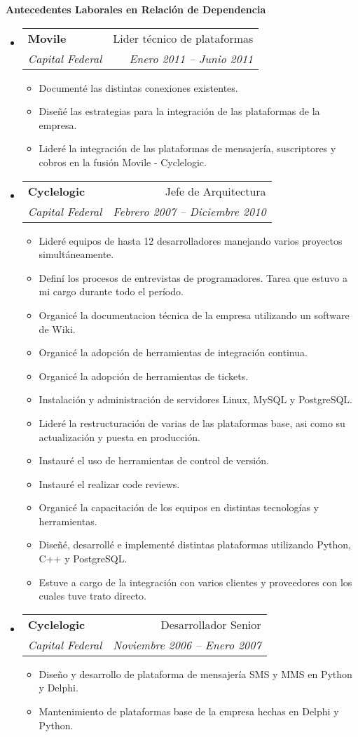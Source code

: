 \documentclass[a4paper,11pt]{article}
\makeatletter
\newcommand{\resitem}[1]{\item #1 \vspace{-2pt}}
\newcommand{\resheading}[1]{{\large \colorbox{mygrey}{\begin{minipage}{\textwidth}{\textbf{#1 \vphantom{p\^{E}}}}\end{minipage}}}}
\newcommand{\ressubheading}[4]{
\begin{tabular*}{6.3in}{l@{\extracolsep{\fill}}r}
		\textbf{#1} & #2 \\
		\textit{#3} & \textit{#4} \\
\end{tabular*}\vspace{-6pt}}
\makeatother
\begin{document}
\resheading{Antecedentes Laborales en Relaci\'on de Dependencia}
	\begin{itemize}
		\item
			\ressubheading{ Movile } { Lider t\'ecnico de plataformas } { Capital Federal } { Enero 2011 -- Junio 2011 }
				{ \footnotesize
					\begin{itemize}
						\resitem{ Document\'e las distintas conexiones existentes. }
						\resitem{ Dise\~n\'e las estrategias para la integraci\'on de las plataformas de la empresa. }
						\resitem{ Lider\'e la integraci\'on de las plataformas de mensajer\'ia, suscriptores y cobros en la fusi\'on Movile - Cyclelogic. }
					\end{itemize}
          		}
		\item
			\ressubheading{ Cyclelogic } { Jefe de Arquitectura } { Capital Federal } { Febrero 2007 -- Diciembre 2010 }
				{ \footnotesize
					\begin{itemize}
						\resitem{ Lider\'e equipos de hasta 12 desarrolladores manejando varios proyectos simult\'aneamente. }
						\resitem{ Defin\'i los procesos de entrevistas de programadores. Tarea que estuvo a mi cargo durante todo el per\'iodo. }
						\resitem{ Organic\'e la documentacion t\'ecnica de la empresa utilizando un software de Wiki. }
						\resitem{ Organic\'e la adopci\'on de herramientas de integraci\'on continua. }
						\resitem{ Organic\'e la adopci\'on de herramientas de tickets. }
						\resitem{ Instalaci\'on y administraci\'on de servidores Linux, MySQL y PostgreSQL. }
						\resitem{ Lider\'e la restructuraci\'on de varias de las plataformas base, asi como su actualizaci\'on y puesta en producci\'on. }
						\resitem{ Instaur\'e el uso de herramientas de control de versi\'on. }
						\resitem{ Instaur\'e el realizar code reviews. }
						\resitem{ Organic\'e la capacitaci\'on de los equipos en distintas tecnolog\'ias y herramientas. }
						\resitem{ Dise\~n\'e, desarroll\'e e implement\'e distintas plataformas utilizando Python, C++ y PostgreSQL. }
						\resitem{ Estuve a cargo de la integraci\'on con varios clientes y proveedores con los cuales tuve trato directo. }
					\end{itemize}
          		}
		\item
			\ressubheading{ Cyclelogic } { Desarrollador Senior } { Capital Federal } { Noviembre 2006 -- Enero 2007 }
				{ \footnotesize
					\begin{itemize}
						\resitem{ Dise\~no y desarrollo de plataforma de mensajer\'ia SMS y MMS en Python y Delphi. }
						\resitem{ Mantenimiento de plataformas base de la empresa hechas en Delphi y Python. }

\end{itemize}}
\end{itemize}
\end{document}
